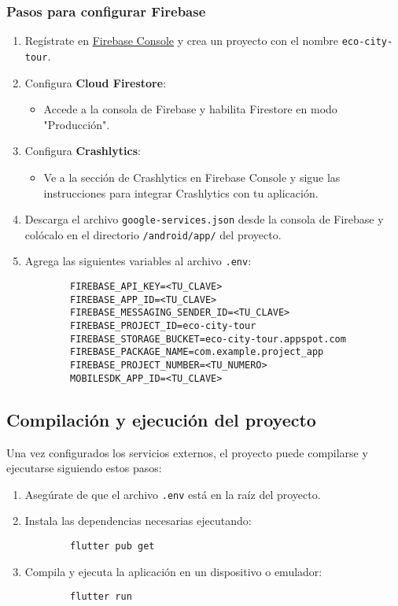 \subsubsection{Pasos para configurar Firebase}
\begin{enumerate}
	\item Regístrate en \href{https://firebase.google.com/}{Firebase Console} y crea un proyecto con el nombre \texttt{eco-city-tour}.
	\item Configura \textbf{Cloud Firestore}:
	\begin{itemize}
		\item Accede a la consola de Firebase y habilita Firestore en modo "Producción".
	\end{itemize}
	\item Configura \textbf{Crashlytics}:
	\begin{itemize}
		\item Ve a la sección de Crashlytics en Firebase Console y sigue las instrucciones para integrar Crashlytics con tu aplicación.
	\end{itemize}
	\item Descarga el archivo \texttt{google-services.json} desde la consola de Firebase y colócalo en el directorio \texttt{/android/app/} del proyecto.
	\item Agrega las siguientes variables al archivo \texttt{.env}:
	\begin{verbatim}
		FIREBASE_API_KEY=<TU_CLAVE>
		FIREBASE_APP_ID=<TU_CLAVE>
		FIREBASE_MESSAGING_SENDER_ID=<TU_CLAVE>
		FIREBASE_PROJECT_ID=eco-city-tour
		FIREBASE_STORAGE_BUCKET=eco-city-tour.appspot.com
		FIREBASE_PACKAGE_NAME=com.example.project_app
		FIREBASE_PROJECT_NUMBER=<TU_NUMERO>
		MOBILESDK_APP_ID=<TU_CLAVE>
	\end{verbatim}
\end{enumerate}

\subsection{Compilación y ejecución del proyecto}

Una vez configurados los servicios externos, el proyecto puede compilarse y ejecutarse siguiendo estos pasos:
\begin{enumerate}
	\item Asegúrate de que el archivo \texttt{.env} está en la raíz del proyecto.
	\item Instala las dependencias necesarias ejecutando:
	\begin{verbatim}
		flutter pub get
	\end{verbatim}
	\item Compila y ejecuta la aplicación en un dispositivo o emulador:
	\begin{verbatim}
		flutter run
	\end{verbatim}
\end{enumerate}

